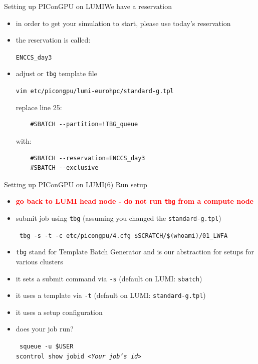 \documentclass[
  aspectratio=169,
  10pt
]{beamer}
\newcommand{\terminal}[1]{\par\noindent\colorbox{shadecolor}
{\parbox{\dimexpr\textwidth-2\fboxsep\relax}{\texttt{#1}}}}
\begin{document}
\begin{frame}[t,fragile]{Setting up PIConGPU on LUMI}{We have a reservation}
\begin{itemize}
    \item in order to get your simulation to start, please use today's reservation
    \item the reservation is called:
    {\Large
    \begin{center}
        \texttt{ENCCS\_day3}
    \end{center}
    }
    \item adjust or \texttt{tbg} template file
    \terminal{vim etc/picongpu/lumi-eurohpc/standard-g.tpl}
    replace line 25: \\
    \begin{verbatim}
    #SBATCH --partition=!TBG_queue
    \end{verbatim}
    with:
    \begin{verbatim}    
    #SBATCH --reservation=ENCCS_day3
    #SBATCH --exclusive
    \end{verbatim}    
\end{itemize}
\end{frame}


\begin{frame}[t,fragile]{Setting up PIConGPU on LUMI}{(6) Run setup}
\begin{itemize}
    \item \textcolor{red}{\textbf{go back to LUMI head node - do not run \texttt{tbg} from a compute node}}
    \item submit job using \texttt{tbg} (assuming you changed the \texttt{standard-g.tpl})
    \terminal{%
        tbg -s -t -c etc/picongpu/4.cfg \$SCRATCH/\$(whoami)/01\_LWFA
    }
    \item \texttt{tbg} stand for Template Batch Generator and is our abstraction for setups for various clusters
    \item it sets a submit command via \texttt{-s} (default on LUMI: \texttt{sbatch})
    \item it uses a template via \texttt{-t} (default on LUMI: \texttt{standard-g.tpl})
    \item it uses a setup configuration 
    \item does your job run?
        \terminal{%
            squeue -u \$USER\\
            scontrol show jobid \textit{<Your job's id>}
        }
\end{itemize}
\end{frame}
\end{document}

